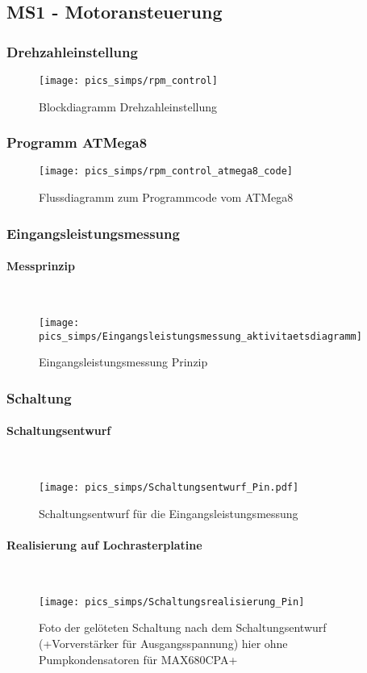 \documentclass[12pt,a4paper]{article}
\begin{document}
\subsection{MS1 - Motoransteuerung}
%
\subsubsection{Drehzahleinstellung}
\begin{figure}[h!]
	\centering
	\texttt{[image: pics\_simps/rpm\_control]}
	\caption{Blockdiagramm Drehzahleinstellung}
\end{figure}
%
\subsubsection{Programm ATMega8}
\begin{figure}[h!]
	\centering
	\texttt{[image: pics\_simps/rpm\_control\_atmega8\_code]}
	\caption{Flussdiagramm zum Programmcode vom ATMega8}
\end{figure}
%
\newpage
\subsubsection{Eingangsleistungsmessung}
\paragraph{Messprinzip}\mbox{}\\
\begin{figure}[h!]
	\centering
	\texttt{[image: pics\_simps/Eingangsleistungsmessung\_aktivitaetsdiagramm]}
	\caption{Eingangsleistungsmessung Prinzip}
\end{figure}
%
\newpage
\subsubsection{Schaltung}
\paragraph{Schaltungsentwurf}\mbox{}\\
\begin{figure}[h!]
	\centering
	\texttt{[image: pics\_simps/Schaltungsentwurf\_Pin.pdf]}
	\caption{Schaltungsentwurf für die Eingangsleistungsmessung}
\end{figure}
%
\newpage
\paragraph{Realisierung auf Lochrasterplatine}\mbox{}\\ %
\begin{figure}[h!]
	\centering
	\texttt{[image: pics\_simps/Schaltungsrealisierung\_Pin]}
	\caption{Foto der gelöteten Schaltung nach dem Schaltungsentwurf (+Vorverstärker für Ausgangsspannung) hier ohne Pumpkondensatoren für MAX680CPA+}
\end{figure}
%
\end{document}
